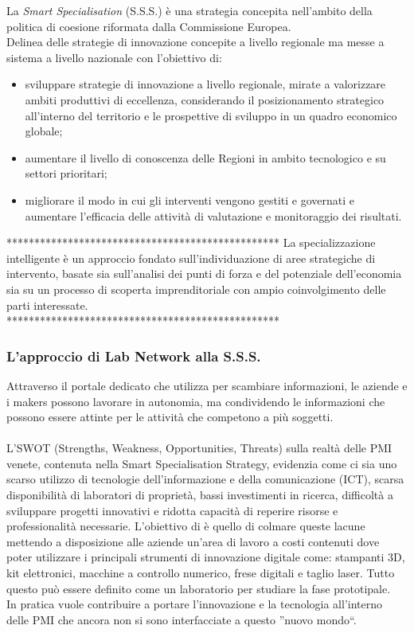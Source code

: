 \noindent La \textit{Smart Specialisation} (S.S.S.) è una strategia concepita nell'ambito della politica di coesione riformata dalla Commissione Europea.\\
Delinea delle strategie di innovazione concepite a livello regionale ma messe a sistema a livello nazionale con l'obiettivo di:
\begin{itemize}
\item sviluppare strategie di innovazione a livello regionale, mirate a valorizzare ambiti produttivi di eccellenza, considerando il posizionamento strategico all'interno del territorio e le prospettive di sviluppo in un quadro economico globale;
\item aumentare il livello di conoscenza delle Regioni in ambito tecnologico e su settori prioritari;
\item migliorare il modo in cui gli interventi vengono gestiti e governati e aumentare l'efficacia delle attività di valutazione e monitoraggio dei risultati.
\end{itemize}
*************************************************
La specializzazione intelligente è un approccio fondato sull'individuazione di aree strategiche di intervento, basate sia sull'analisi dei punti di forza e del potenziale dell'economia sia su un processo di scoperta imprenditoriale con ampio coinvolgimento delle parti interessate.\\
*************************************************
\\
\subsubsection{L'approccio di Lab Network alla S.S.S.}
Attraverso il portale dedicato che \lab{} utilizza per scambiare informazioni, le aziende e i makers possono lavorare in autonomia, ma condividendo le informazioni che possono essere attinte per le attività che competono a più soggetti.\\
\\
L'\gls{SWOT} (Strengths, Weakness, Opportunities, Threats) sulla realtà delle PMI venete, contenuta nella Smart Specialisation Strategy, evidenzia come ci sia uno scarso utilizzo di tecnologie dell'informazione e della comunicazione (ICT), scarsa disponibilità di laboratori di proprietà, bassi investimenti in ricerca, difficoltà a sviluppare progetti innovativi e ridotta capacità di reperire risorse e professionalità necessarie. 
L'obiettivo di \lab{} è quello di colmare queste lacune mettendo a disposizione alle aziende un'area di lavoro a costi contenuti dove poter utilizzare i principali strumenti di innovazione digitale come: stampanti 3D, kit elettronici, macchine a controllo numerico, frese digitali e taglio laser. Tutto questo può essere definito come un laboratorio per studiare la fase prototipale.
\\
In pratica \lab{} vuole contribuire a portare l'innovazione e la tecnologia all'interno delle PMI che ancora non si sono interfacciate a questo ''nuovo mondo``.

